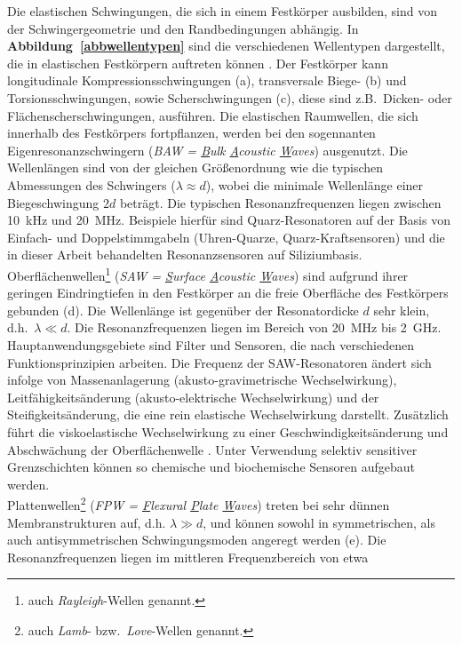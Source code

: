 Die elastischen Schwingungen, die sich in einem Festkörper ausbilden,
sind von der Schwingergeometrie und den Randbedingungen abhängig.  In
{\bf Abbildung~\ref{abbwellentypen}} sind die verschiedenen
Wellentypen dargestellt, die in
elastischen Festkörpern auftreten können \cite{Whi70}.  Der Festkörper kann
longitudinale Kompressionsschwingungen (a), transversale Biege- (b) und
Torsionsschwingungen, sowie Scherschwingungen (c), diese sind z.B.\
Dicken- oder Flächenscherschwingungen, ausführen. Die elastischen Raumwellen,
die sich innerhalb des Festkörpers fortpflanzen, werden bei den sogennanten
Eigenresonanzschwingern ({\sl BAW = \underline{B}ulk
\underline{A}coustic \underline{W}aves}) ausgenutzt.  Die Wellenlängen
sind von der gleichen Größenordnung wie die typischen Abmessungen des
Schwingers ($\lambda \approx d$), wobei die minimale Wellenlänge
einer Biegeschwingung $2d$ beträgt.  Die typischen Resonanzfrequenzen
liegen zwischen 10~kHz und 20~MHz. Beispiele hierfür sind
Quarz-Resonatoren auf der Basis von Einfach- und Doppelstimmgabeln
(Uhren-Quarze, Quarz-Kraftsensoren) und die in dieser Arbeit behandelten
Resonanzsensoren auf Siliziumbasis.\\
Oberflächenwellen\footnote{auch {\sl Rayleigh}-Wellen genannt.}
({\sl SAW = \underline{S}urface \underline{A}coustic \underline{W}aves})
sind aufgrund ihrer geringen Eindringtiefen in den Festkörper an die freie
Oberfläche des Festkörpers gebunden (d). Die Wellenlänge ist gegenüber der
Resonatordicke $d$ sehr
klein, d.h.\ $\lambda \ll d$.  Die Resonanzfrequenzen liegen im
Bereich von 20~MHz bis 2~GHz. Hauptanwendungsgebiete sind Filter und
Sensoren, die nach verschiedenen Funktionsprinzipien arbeiten. Die Frequenz
der SAW-Resonatoren ändert sich infolge von
Massenanlagerung (akusto-gravimetrische Wechselwirkung),
Leitfähigkeitsänderung (akusto-elektrische Wechselwirkung) und der
Steifigkeitsänderung, die eine rein elastische Wechselwirkung darstellt.
Zusätzlich führt die viskoelastische Wechselwirkung zu einer
Geschwindigkeitsänderung und Abschwächung der Oberflächenwelle \cite{Ric91}.
Unter Verwendung selektiv sensitiver Grenzschichten können so chemische
und biochemische Sensoren aufgebaut werden. \\
Plattenwellen\footnote{auch {\sl Lamb}- bzw.\ {\sl Love}-Wellen genannt.}
({\sl FPW = \underline{F}lexural \underline{P}late
\underline{W}aves}) treten bei sehr dünnen Membranstrukturen auf, d.h.
$\lambda \gg d$, und können sowohl in symmetrischen, als auch
antisymmetrischen Schwingungsmoden angeregt werden (e). Die
Resonanzfrequenzen liegen im mittleren Frequenzbereich von etwa
